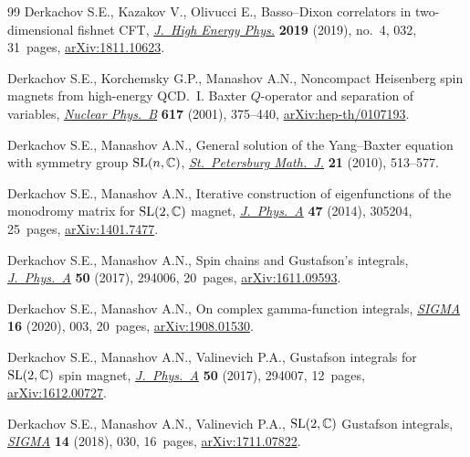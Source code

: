 \documentclass[pdftex]{sigma}
\numberwithin{equation}{section}
\begin{document}
\begin{thebibliography}{99}
Derkachov S.E., Kazakov V., Olivucci E., Basso--{D}ixon correlators in
 two-dimensional fishnet {CFT},
 \href{https://doi.org/10.1007/jhep04(2019)032}{\textit{J.~High Energy Phys.}}
 \textbf{2019} (2019), no.~4, 032, 31~pages,
 \href{http://arxiv.org/abs/1811.10623}{arXiv:1811.10623}.

Derkachov S.E., Korchemsky G.P., Manashov A.N., Noncompact {H}eisenberg spin
 magnets from high-energy {QCD}.~{I}. {B}axter {$Q$}-operator and separation
 of variables,
 \href{https://doi.org/10.1016/S0550-3213(01)00457-6}{\textit{Nuclear
 Phys.~B}} \textbf{617} (2001), 375--440,
 \href{http://arxiv.org/abs/hep-th/0107193}{arXiv:hep-th/0107193}.

Derkachov S.E., Manashov A.N., General solution of the {Y}ang--{B}axter
 equation with symmetry group {${\rm SL}(n,\mathbb{C})$},
 \href{https://doi.org/10.1090/S1061-0022-2010-01106-3}{\textit{St.~Petersburg
 Math.~J.}} \textbf{21} (2010), 513--577.

Derkachov S.E., Manashov A.N., Iterative construction of eigenfunctions of the
 monodromy matrix for {${\rm SL}(2,\mathbb{C})$} magnet,
 \href{https://doi.org/10.1088/1751-8113/47/30/305204}{\textit{J.~Phys.~A}}
 \textbf{47} (2014), 305204, 25~pages,
 \href{http://arxiv.org/abs/1401.7477}{arXiv:1401.7477}.

Derkachov S.E., Manashov A.N., Spin chains and {G}ustafson's integrals,
 \href{https://doi.org/10.1088/1751-8121/aa749a}{\textit{J.~Phys.~A}}
 \textbf{50} (2017), 294006, 20~pages,
 \href{http://arxiv.org/abs/1611.09593}{arXiv:1611.09593}.

Derkachov S.E., Manashov A.N.,
On complex gamma-function integrals,
\href{https://doi.org/10.3842/SIGMA.2020.003}{\textit{SIGMA}} \textbf{16} (2020), 003, 20~pages,
\href{http://arxiv.org/abs/1908.01530}{arXiv:1908.01530}.


Derkachov S.E., Manashov A.N., Valinevich P.A., Gustafson integrals for {${\rm
 SL}(2,\mathbb{C})$} spin magnet,
 \href{https://doi.org/10.1088/1751-8121/aa7480}{\textit{J.~Phys.~A}}
 \textbf{50} (2017), 294007, 12~pages,
 \href{http://arxiv.org/abs/1612.00727}{arXiv:1612.00727}.

Derkachov S.E., Manashov A.N., Valinevich P.A., {${\rm SL}(2,\mathbb{C})$}
 {G}ustafson integrals,
 \href{https://doi.org/10.3842/SIGMA.2018.030}{\textit{SIGMA}} \textbf{14}
 (2018), 030, 16~pages,
 \href{http://arxiv.org/abs/1711.07822}{arXiv:1711.07822}.


\end{thebibliography}
\end{document}
